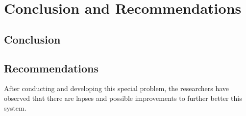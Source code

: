 \chapter{Conclusion and Recommendations}

\section{Conclusion}


\section{Recommendations}
After conducting and developing this special problem, the researchers have
observed that there are lapses and possible improvements to further better this system.